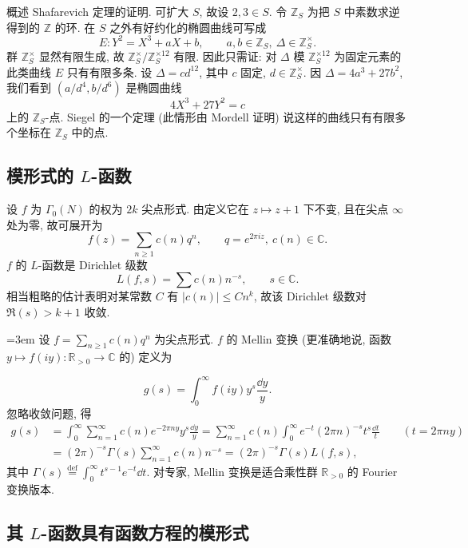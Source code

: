 概述 Shafarevich 定理的证明. 可扩大 $S$, 故设 $2, 3\in S$. 令 $\mathbb{Z}_S$ 为把 $S$ 中素数求逆得到的 $\mathbb{Z}$ 的环. 在 $S$ 之外有好约化的椭圆曲线可写成
\[
E\colon Y^2 = X^3 + aX + b, \qquad a, b\in\mathbb{Z}_S, \ \Delta\in\mathbb{Z}_S^{\times}.
\]
群 $\mathbb{Z}_S^{\times}$ 显然有限生成, 故 $\mathbb{Z}_S^{\times}/\mathbb{Z}_S^{\times12}$ 有限. 因此只需证: 对 $\Delta$ 模 $\mathbb{Z}_S^{\times12}$ 为固定元素的此类曲线 $E$ 只有有限多条. 设 $\Delta = cd^{12}$, 其中 $c$ 固定, $d\in\mathbb{Z}_S^{\times}$. 因 $\Delta = 4a^3 + 27b^2$, 我们看到 $(a/d^4, b/d^6)$ 是椭圆曲线
\[
4X^3 + 27Y^2 = c
\]
上的 $\mathbb{Z}_S$-点. Siegel 的一个定理 (此情形由 Mordell 证明) 说这样的曲线只有有限多个坐标在 $\mathbb{Z}_S$ 中的点.

\subsection*{模形式的 $L$-函数}

设 $f$ 为 $\Gamma_0(N)$ 的权为 $2k$ 尖点形式. 由定义它在 $z\mapsto z+1$ 下不变, 且在尖点 $\infty$ 处为零, 故可展开为
\[
f(z) = \sum_{n\ge 1}c(n)q^n, \qquad q = e^{2\pi iz}, \ c(n)\in\mathbb{C}.
\]
$f$ 的 $L$-函数是 Dirichlet 级数
\[
L(f, s) = \sum c(n)n^{-s}, \qquad s\in\mathbb{C}.
\]
相当粗略的估计表明对某常数 $C$ 有 $|c(n)|\le Cn^k$, 故该 Dirichlet 级数对 $\Re(s) > k + 1$ 收敛.

\begin{remark} \label{thm:5.4.3} 
{\emergencystretch=3em 设 $f = \sum_{n\ge 1}c(n)q^n$ 为尖点形式. $f$ 的 Mellin 变换 (更准确地说, 函数 $y\mapsto f(iy)\colon\mathbb{R}_{>0}\to\mathbb{C}$ 的) 定义为\par}
\[
g(s) = \int_0^{\infty}f(iy)y^s\frac{\dd y}{y}.
\]
忽略收敛问题, 得
\begin{align*}
g(s) &= \int_0^{\infty}\sum_{n=1}^{\infty}c(n)e^{-2\pi ny}y^s\frac{\dd y}{y}
= \sum_{n=1}^{\infty}c(n)\int_0^{\infty}e^{-t}(2\pi n)^{-s}t^s\frac{\dd t}{t} \qquad (t = 2\pi ny)\\
&= (2\pi)^{-s}\Gamma(s)\sum_{n=1}^{\infty}c(n)n^{-s} = (2\pi)^{-s}\Gamma(s)L(f, s),
\end{align*}
其中 $\Gamma(s) \overset{\text{def}}{=} \int_0^{\infty}t^{s-1}e^{-t}\dd t$. 对专家, Mellin 变换是适合乘性群 $\mathbb{R}_{>0}$ 的 Fourier 变换版本.
\end{remark}

\subsection*{其 $L$-函数具有函数方程的模形式}

